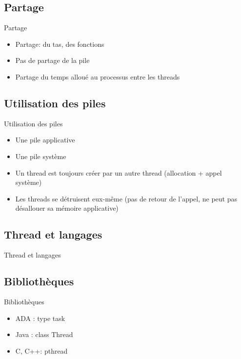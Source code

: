 \subsection{\sectitle}
\begin{frame}{\sectitle}
    \def\subsectitle{Partage}
    \subsection{\subsectitle}
    \begin{block}{\subsectitle}
        \begin{itemize}
            \item Partage: du tas, des fonctions
            \item Pas de partage de la pile
            \item Partage du temps alloué au processus entre les threads 
        \end{itemize}
    \end{block}

    \def\subsectitle{Utilisation des piles}
    \subsection{\subsectitle}
    \begin{block}{\subsectitle}
        \begin{itemize}
            \item Une pile applicative
            \item Une pile système
            \item Un thread est toujours créer par un autre thread (allocation +
                appel système)
            \item Les threads se détruisent eux-même (pas de retour de l'appel,
                ne peut pas désallouer sa mémoire applicative)
        \end{itemize}
    \end{block}
\end{frame}

\def\sectitle{Thread et langages}
\subsection{\sectitle}
\begin{frame}{\sectitle}
    \def\subsectitle{Bibliothèques}
    \subsection{\subsectitle}
    \begin{block}{\subsectitle}
        \begin{itemize}
            \item ADA : type task
            \item Java : class Thread
            \item C, C++: pthread
        \end{itemize}
    \end{block}
\end{frame}

